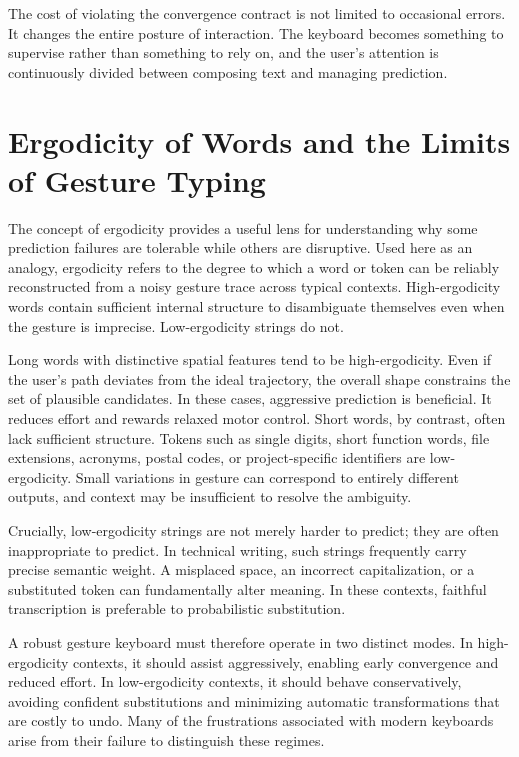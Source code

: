 \documentclass[11pt]{article}
\begin{document}
The cost of violating the convergence contract is not limited to occasional errors. It changes the entire posture of interaction. The keyboard becomes something to supervise rather than something to rely on, and the user’s attention is continuously divided between composing text and managing prediction.

\section{Ergodicity of Words and the Limits of Gesture Typing}

The concept of ergodicity provides a useful lens for understanding why some prediction failures are tolerable while others are disruptive. Used here as an analogy, ergodicity refers to the degree to which a word or token can be reliably reconstructed from a noisy gesture trace across typical contexts. High-ergodicity words contain sufficient internal structure to disambiguate themselves even when the gesture is imprecise. Low-ergodicity strings do not.

Long words with distinctive spatial features tend to be high-ergodicity. Even if the user’s path deviates from the ideal trajectory, the overall shape constrains the set of plausible candidates. In these cases, aggressive prediction is beneficial. It reduces effort and rewards relaxed motor control. Short words, by contrast, often lack sufficient structure. Tokens such as single digits, short function words, file extensions, acronyms, postal codes, or project-specific identifiers are low-ergodicity. Small variations in gesture can correspond to entirely different outputs, and context may be insufficient to resolve the ambiguity.

Crucially, low-ergodicity strings are not merely harder to predict; they are often inappropriate to predict. In technical writing, such strings frequently carry precise semantic weight. A misplaced space, an incorrect capitalization, or a substituted token can fundamentally alter meaning. In these contexts, faithful transcription is preferable to probabilistic substitution.

A robust gesture keyboard must therefore operate in two distinct modes. In high-ergodicity contexts, it should assist aggressively, enabling early convergence and reduced effort. In low-ergodicity contexts, it should behave conservatively, avoiding confident substitutions and minimizing automatic transformations that are costly to undo. Many of the frustrations associated with modern keyboards arise from their failure to distinguish these regimes.
\end{document}
